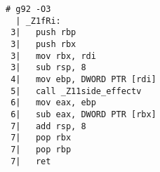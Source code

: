 \begin{lstlisting}[language={},numbers=none,title=\href{https://godbolt.org/z/dG77f4}{\texttt{godbolt.org/z/dG77f4}}]
# g92 -O3
  | _Z1fRi:
 3|   push rbp
 3|   push rbx
 3|   mov rbx, rdi
 3|   sub rsp, 8
 4|   mov ebp, DWORD PTR [rdi]
 5|   call _Z11side_effectv
 6|   mov eax, ebp
 6|   sub eax, DWORD PTR [rbx]
 7|   add rsp, 8
 7|   pop rbx
 7|   pop rbp
 7|   ret
\end{lstlisting}
